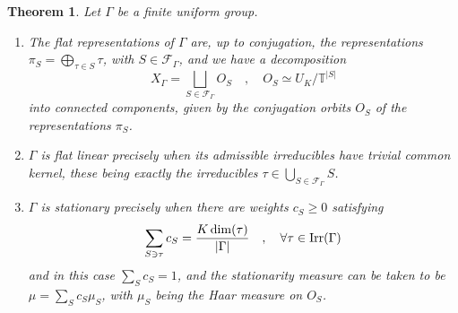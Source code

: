 \documentclass[12pt]{amsart}
\newtheorem{theorem}{Theorem}[section]
\theoremstyle{definition}
\begin{document}
\begin{theorem}
Let $\Gamma$ be a finite uniform group.
\begin{enumerate}
\item The flat representations of $\Gamma$ are, up to conjugation, the representations $\pi_S=\bigoplus_{\tau\in S}\tau$, with $S\in\mathcal F_\Gamma$, and we have a decomposition
$$X_\Gamma=\bigsqcup_{S\in\mathcal F_\Gamma}O_S\quad,\quad O_S\simeq U_K/\mathbb T^{|S|}$$
into connected components, given by the conjugation orbits $O_S$ of the representations $\pi_S$.

\item $\Gamma$ is flat linear precisely when its admissible irreducibles have trivial common kernel, these being exactly the irreducibles $\tau\in\bigcup_{S\in\mathcal F_\Gamma}S$.

\item $\Gamma$ is stationary precisely when there are weights $c_S\geq0$ satisfying
$$\sum_{S\ni\tau}c_S=\frac{K\dim(\tau)}{|\Gamma|}\quad,\quad\forall\tau\in{\rm Irr}(\Gamma)$$
and in this case $\sum_Sc_S=1$, and the stationarity measure can be taken to be $\mu=\sum_Sc_S\mu_S$, with $\mu_S$ being the Haar measure on $O_S$.
\end{enumerate}
\end{theorem}
\end{document}
